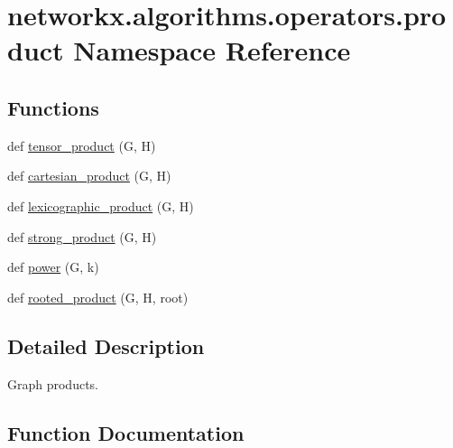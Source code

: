 \hypertarget{namespacenetworkx_1_1algorithms_1_1operators_1_1product}{}\section{networkx.\+algorithms.\+operators.\+product Namespace Reference}
\label{namespacenetworkx_1_1algorithms_1_1operators_1_1product}
\subsection*{Functions}
\begin{DoxyCompactItemize}
\item 
def \hyperlink{namespacenetworkx_1_1algorithms_1_1operators_1_1product_ac5acdf8fc9f1bdfa8a6f81c4fb7f55b5}{tensor\+\_\+product} (G, H)
\item 
def \hyperlink{namespacenetworkx_1_1algorithms_1_1operators_1_1product_a2bdf7fde212f1b849d13738c7e505aeb}{cartesian\+\_\+product} (G, H)
\item 
def \hyperlink{namespacenetworkx_1_1algorithms_1_1operators_1_1product_a5edd4339754f8c3930f3c795bcc23cfa}{lexicographic\+\_\+product} (G, H)
\item 
def \hyperlink{namespacenetworkx_1_1algorithms_1_1operators_1_1product_ac2fd96ada7b316ecd585222820e25734}{strong\+\_\+product} (G, H)
\item 
def \hyperlink{namespacenetworkx_1_1algorithms_1_1operators_1_1product_a3402ece922a3078e26ce290eed5b5efc}{power} (G, k)
\item 
def \hyperlink{namespacenetworkx_1_1algorithms_1_1operators_1_1product_a737cdf389d0bbf790ef6f4b15e84517e}{rooted\+\_\+product} (G, H, root)
\end{DoxyCompactItemize}


\subsection{Detailed Description}
\begin{DoxyVerb}Graph products.
\end{DoxyVerb}
 

\subsection{Function Documentation}
\mbox{\label{namespacenetworkx_1_1algorithms_1_1operators_1_1product_a2bdf7fde212f1b849d13738c7e505aeb}} 
